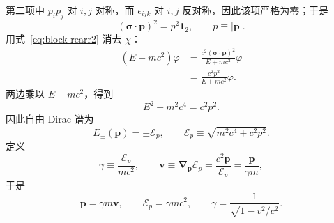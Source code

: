 第二项中 $p_ip_j$ 对 $i,j$ 对称，而 $\epsilon_{ijk}$ 对 $i,j$ 反对称，因此该项严格为零；于是
\begin{equation}
 (\bm\sigma\cdot\bm p)^2=p^2\mathbf 1_2,
 \qquad p\equiv|\bm p|.
 \label{eq:sigmap-square}
\end{equation}
用式~\eqref{eq:block-rearr2} 消去 $\chi$：
\begin{align}
 (E-mc^2)\varphi
 &=\frac{c^2(\bm\sigma\cdot\bm p)^2}{E+mc^2}\varphi\\
 &=\frac{c^2p^2}{E+mc^2}\varphi.
\end{align}
两边乘以 $E+mc^2$，得到
\begin{equation}
 E^2-m^2c^4=c^2p^2.
\end{equation}
因此自由 Dirac 谱为
\begin{equation}
 \boxed{E_\pm(\bm p)=\pm \mathcal E_p,\qquad
 \mathcal E_p\equiv\sqrt{m^2c^4+c^2p^2}.}
 \label{eq:dispersion}
\end{equation}
定义
\begin{equation}
 \gamma\equiv\frac{\mathcal E_p}{mc^2},
 \qquad
 \bm v\equiv\bm\nabla_{\bm p}\mathcal E_p
 =\frac{c^2\bm p}{\mathcal E_p}
 =\frac{\bm p}{\gamma m},
 \label{eq:relrelations-vector}
\end{equation}
于是
\begin{equation}
 \bm p=\gamma m\bm v,
 \qquad
 \mathcal E_p=\gamma mc^2,
 \qquad
 \gamma=\frac{1}{\sqrt{1-v^2/c^2}}.
 \label{eq:relrelations}
\end{equation}

